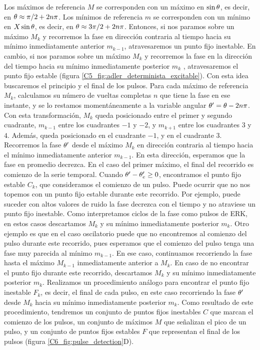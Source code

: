 \documentclass[./main.tex]{subfiles}
\begin{document}
Los máximos de referencia $M$ se corresponden con un máximo en $\sin{\ensuremath{\theta}}$, es decir, en $\theta \approx \pi/2 + 2n\pi$. Los mínimos de referencia $m$ se corresponden con un mínimo en $X\sin{\ensuremath{\theta}}$, es decir, en $\theta \approx 3\pi/2 + 2n\pi$. Entonces, si nos paramos sobre un máximo $M_k$ y recorremos la fase en dirección contraria al tiempo hacia su mínimo inmediatamente anterior $m_{k-1}$, atravesaremos un punto fijo inestable. En cambio, si nos paramos sobre un máximo $M_k$ y recorremos la fase en la dirección del tiempo hacia su mínimo inmediatamente posterior $m_{k}$ , atravesaremos el punto fijo estable (figura \ref{C5_fig:adler_determinista_excitable}). Con esta idea buscaremos el principio y el final de los pulsos. Para cada máximo de referencia $M_k$, calculamos su número de vueltas completas $n$ que tiene la fase en ese instante, y se lo restamos momentáneamente a la variable angular $\theta' = \theta - 2n \pi$. Con esta transformación, $M_k$ queda posicionado entre el primer y segundo cuadrante, $m_{k-1}$ entre los cuadrantes $-1$ y $-2$, y $m_{k+1}$ entre los cuadrantes $3$ y $4$. Además, \xxe queda posicionado en el cuadrante $-1$, y \xxi en el cuadrante $3$. Recorremos la fase $\theta'$ desde el máximo $M_k$ en dirección contraria al tiempo hacia el mínimo inmediatamente anterior $m_{k-1}$. En esta dirección, esperamos que la fase \xx en promedio decrezca. En el caso del primer máximo, el final del recorrido es comienzo de la serie temporal. Cuando $\theta' - \theta_e' \geq 0$, encontramos el punto fijo estable $C_k$, que consideramos el comienzo de un pulso. Puede ocurrir que no nos topemos con un punto fijo estable durante este recorrido. Por ejemplo, puede suceder con altos valores de ruido la fase decrezca con el tiempo y no atraviese un punto fijo inestable. Como interpretamos ciclos de la fase como pulsos de ERK, en estos casos descartamos $M_k$ y su mínimo inmediatamente posterior $m_k$. Otro ejemplo es que en el caso oscilatorio puede que no encontremos al comienzo del pulso durante este recorrido, pues esperamos que el comienzo del pulso tenga una fase muy parecida al mínimo $m_{k-1}$. En ese caso, continuamos recorriendo la fase hasta el máximo $M_{k-1}$ inmediatamente anterior a $M_k$. En caso de no encontrar el punto fijo durante este recorrido, descartamos $M_k$ y su mínimo inmediatamente posterior $m_k$. Realizamos un procedimiento análogo para encontrar el punto fijo inestable $F_k$, es decir, el final de cada pulso, en este caso recorriendo la fase $\theta'$ desde $M_k$ hacia su mínimo inmediatamente posterior $m_k$. Como resultado de este procedimiento, tendremos un conjunto de puntos fijos inestables $C$ que marcan el comienzo de los pulsos, un conjunto de máximos $M$ que señalizan el pico de un pulso, y un conjunto de puntos fijos estables $F$ que representan el final de los pulsos (figura \ref{C6_fig:pulse_detection}D). 
\end{document}
